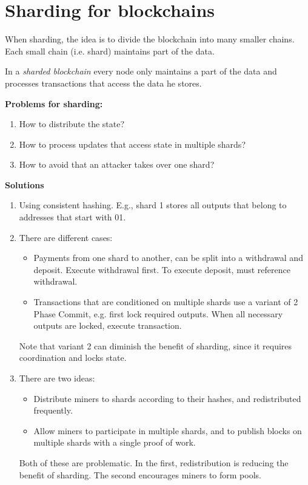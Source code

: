 \section{Sharding for blockchains}
When sharding, the idea is to divide the blockchain into many smaller chains. Each small chain (i.e. shard) maintains part of the data.

\begin{definition} In a \emph{sharded blockchain} every node only maintains a part of the data and processes transactions that access the data he stores.
\end{definition}

\begin{note} \textbf{Problems for sharding:}
	\begin{enumerate}[label=\Alph*)]
		\item How to distribute the state?
		\item How to process updates that access state in multiple shards?
		\item How to avoid that an attacker takes over one shard?
	\end{enumerate}
\noindent
\textbf{Solutions}
\begin{enumerate}[label=\Alph*)]
	\item Using consistent hashing. E.g., shard 1 stores all outputs that belong to addresses that start with 01.
	\item There are different cases:
	\begin{itemize}
		\item Payments from one shard to another, can be split into a withdrawal and deposit. Execute withdrawal first. To execute deposit, must reference withdrawal.
		\item Transactions that are conditioned on multiple shards use a variant of 2 Phase Commit, e.g. first lock required outputs. When all necessary outputs are locked, execute transaction.
	\end{itemize}
	Note that variant 2 can diminish the benefit of sharding, since it requires coordination and locks state.
	\item There are two ideas:
	\begin{itemize}
		\item Distribute miners to shards according to their hashes, and redistributed frequently.
		\item Allow miners to participate in multiple shards, and to publish blocks on multiple shards with a single proof of work. 
		
	\end{itemize}
	Both of these are problematic. In the first, redistribution is reducing the benefit of sharding. The second encourages miners to form pools.
\end{enumerate}

\end{note}